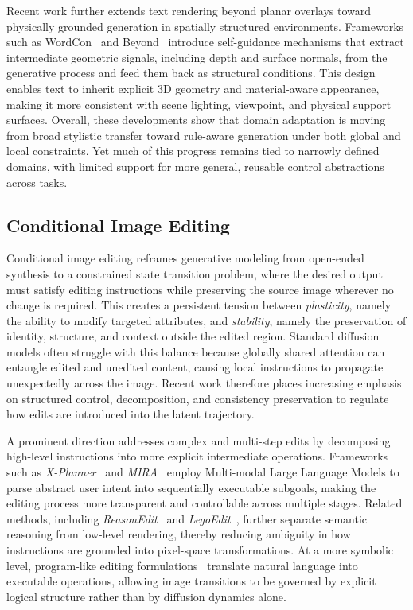 Recent work further extends text rendering beyond planar overlays toward physically grounded generation in spatially structured environments. Frameworks such as WordCon~\citep{Shi2025WordConWT} and Beyond~\citep{Luo2025BeyondFT} introduce self-guidance mechanisms that extract intermediate geometric signals, including depth and surface normals, from the generative process and feed them back as structural conditions. This design enables text to inherit explicit 3D geometry and material-aware appearance, making it more consistent with scene lighting, viewpoint, and physical support surfaces. Overall, these developments show that domain adaptation is moving from broad stylistic transfer toward rule-aware generation under both global and local constraints. Yet much of this progress remains tied to narrowly defined domains, with limited support for more general, reusable control abstractions across tasks.




\subsection{Conditional Image Editing}
\label{subsec:conditional_editing}

Conditional image editing reframes generative modeling from open-ended synthesis to a constrained state transition problem, where the desired output must satisfy editing instructions while preserving the source image wherever no change is required. This creates a persistent tension between \textit{plasticity}, namely the ability to modify targeted attributes, and \textit{stability}, namely the preservation of identity, structure, and context outside the edited region. Standard diffusion models often struggle with this balance because globally shared attention can entangle edited and unedited content, causing local instructions to propagate unexpectedly across the image. Recent work therefore places increasing emphasis on structured control, decomposition, and consistency preservation to regulate how edits are introduced into the latent trajectory.

A prominent direction addresses complex and multi-step edits by decomposing high-level instructions into more explicit intermediate operations. Frameworks such as \textit{X-Planner}~\citep{Yeh2025BeyondSE} and \textit{MIRA}~\citep{Zeng2025MIRAMI} employ Multi-modal Large Language Models to parse abstract user intent into sequentially executable subgoals, making the editing process more transparent and controllable across multiple stages. Related methods, including \textit{ReasonEdit}~\citep{Yin2025ReasonEditTR} and \textit{LegoEdit}~\citep{Jia2025LegoEditAG}, further separate semantic reasoning from low-level rendering, thereby reducing ambiguity in how instructions are grounded into pixel-space transformations. At a more symbolic level, program-like editing formulations~\citep{Hu2025ImageEA} translate natural language into executable operations, allowing image transitions to be governed by explicit logical structure rather than by diffusion dynamics alone.


